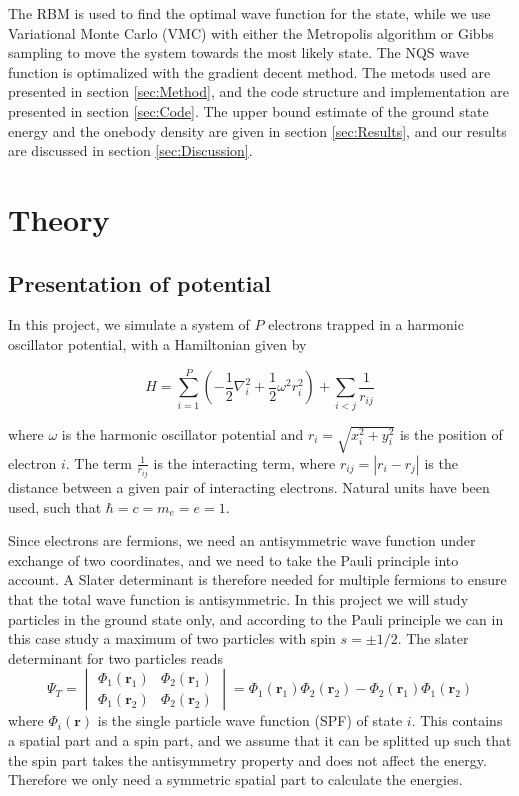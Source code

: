 \documentclass[norsk,a4paper,12pt]{article}
\begin{document}
The RBM is used to find the optimal wave function for the state, while we use Variational Monte Carlo (VMC) with either the Metropolis algorithm or Gibbs sampling to move the system towards the most likely state. The NQS wave function is optimalized with the gradient decent method.  The metods used are presented in section \ref{sec:Method}, and the code structure and implementation are presented in section \ref{sec:Code}. The upper bound estimate of the ground state energy and the onebody density are given in section \ref{sec:Results}, and our results are discussed in section \ref{sec:Discussion}.


 


\section{Theory} \label{sec:Theory}
\subsection{Presentation of potential} \label{sec:Presentation_of_potential}
In this project, we simulate a system of $P$ electrons trapped in a harmonic oscillator potential, with a Hamiltonian given by

\begin{equation}
\label{eq:Hamiltonian}
\hat{H} = \sum_{i=1}^{P} (-\frac{1}{2} \nabla_i^2 + \frac{1}{2} \omega^2 r_i ^2) + \sum_{i<j} \frac{1}{r_{ij}} 
\end{equation}

where $\omega$ is the harmonic oscillator potential and  $r_i = \sqrt{x_i^2 + y_i^2}$ is the position of electron $i$. The term $\frac{1}{r_{ij}}$ is the interacting term, where $r_{ij} = |r_i - r_j|$ is the distance between a given pair of interacting electrons. Natural units have been used, such that $\hbar = c = m_e = e = 1$.

Since electrons are fermions, we need an antisymmetric wave function under exchange of two coordinates, and we need to take the Pauli principle into account. A Slater determinant is therefore needed for multiple fermions to ensure that the total wave function is antisymmetric. In this project we will study particles in the ground state only, and according to the Pauli principle we can in this case study a maximum of two particles with spin $s=\pm 1/2$. The slater determinant for two particles reads
\begin{equation}
\Psi_T=
\begin{vmatrix}
\Phi_1(\boldsymbol{r}_1) & \Phi_2(\boldsymbol{r}_1)\\
\Phi_1(\boldsymbol{r}_2) & \Phi_2(\boldsymbol{r}_2)
\end{vmatrix}
=\Phi_1(\boldsymbol{r}_1)\Phi_2(\boldsymbol{r}_2)-\Phi_2(\boldsymbol{r}_1)\Phi_1(\boldsymbol{r}_2)
\end{equation}
where $\Phi_i(\boldsymbol{r})$ is the single particle wave function (SPF) of state $i$. This contains a spatial part and a spin part, and we assume that it can be splitted up such that the spin part takes the antisymmetry property and does not affect the energy. Therefore we only need a symmetric spatial part to calculate the energies.
\end{document}
